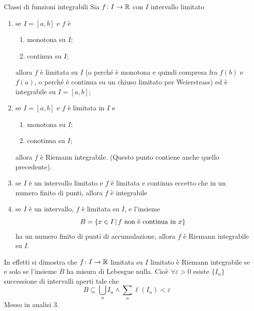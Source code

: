 \documentclass[a4paper]{article}
\begin{document}
\begin{snippettheorem}{Classi di funzioni integrabili}
    Sia \(f\colon I \to \mathbb{R}\) con \(I\) intervallo limitato
    \begin{enumerate}
        \item se \(I=[a,b]\) e \(f\) è
            \begin{enumerate}
                \item monotona su \(I\);
                \item continua su \(I\);
            \end{enumerate}
            allora \(f\) è limitata su \(I\) (o perché è monotona e quindi compresa fra \(f(b)\) e \(f(a)\),
            o perché è continua su un chiuso limitato per Weierstrass)
            ed è integrabile su \(I=[a,b]\);
        \item se \(I = [a,b]\) e \(f\) è limitata in \(I\) e
            \begin{enumerate}
                \item monotona su \(I\);
                \item conotinua su \(I\);
            \end{enumerate}
            allora \(f\) è Riemann integrabile. (Questo punto contiene anche quello precedente).
        \item se \(I\) è un intervallo limitato e \(f\) è limitata e continua
        eccetto che in un numero finito di punti, allora \(f\) è integrabile
        \item se \(I\) è un intervallo, \(f\) è limitata su \(I\), e l'insieme
        \[
            B = \{ x\in I \,|\, f \text{ non è continua in } x\}
        \]
        ha un numero finito di punti di accumulazione, allora \(f\) è Riemann integrabile su \(I\).
    \end{enumerate}
\end{snippettheorem}

In effetti si dimostra che \(f\colon I \to \mathbb{R}\) limitata su \(I\)
limitato è Riemann integrabile se e solo se l'insieme \(B\) ha misura di Lebesgue nulla.
Cioè \(\forall \varepsilon > 0\) esiste \(\{I_n\}\) successione di intervalli aperti tale che
\[
    B \subseteq \bigcup_n I_n \land \sum_n \ell(I_n) < \varepsilon
\]
Messo in analisi 3.
\end{document}

